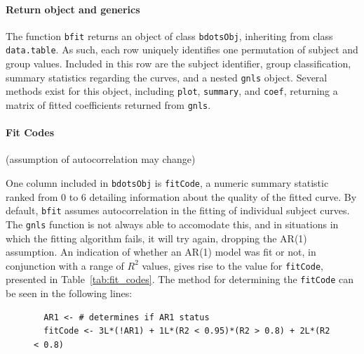 \documentclass{article}
\newcommand{\xt}{\texttt}%
\begin{document}
\paragraph{Return object and generics}


The function \texttt{bfit} returns an object of class \texttt{bdotsObj}, inheriting from class \texttt{data.table}. As such, each row uniquely identifies one permutation of subject and group values. Included in this row are the subject identifier, group classification, summary statistics regarding the curves, and a nested \xt{gnls} object. Several methods exist for this object, including \texttt{plot}, \texttt{summary}, and \texttt{coef}, returning a matrix of fitted coefficients returned from \texttt{gnls}. 


\paragraph{Fit Codes}

(assumption of autocorrelation may change)

One column included in \xt{bdotsObj} is \xt{fitCode}, a numeric summary statistic ranked from 0 to 6 detailing information about the quality of the fitted curve. By default, \xt{bfit} assumes autocorrelation in the fitting of individual subject curves. The \xt{gnls} function is not always able to accomodate this, and in situations in which the fitting algorithm fails, it will try again, dropping the AR(1) assumption. An indication of whether an AR(1) model was fit or not, in conjunction with a range of $R^2$ values, gives rise to the value for \xt{fitCode}, presented in Table~\ref{tab:fit_codes}. The method for determining the \xt{fitCode} can be seen in the following lines:

\begin{singlespace}
\begin{figure}[H]
\centering
\begin{BVerbatim}
  AR1 <- # determines if AR1 status
  fitCode <- 3L*(!AR1) + 1L*(R2 < 0.95)*(R2 > 0.8) + 2L*(R2 < 0.8)
\end{BVerbatim}
\end{figure}
\end{singlespace}
\end{document}
